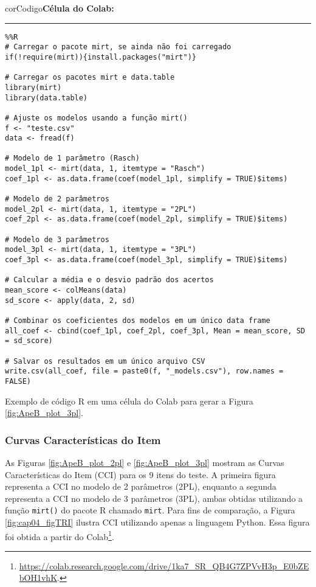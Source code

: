 \begin{listing}[!ht]
    \begin{myboxCode}{corCodigo}{\textbf{Célula do Colab: }}\vspace{3mm}
    \hrule
    \begin{verbatim}
%%R
# Carregar o pacote mirt, se ainda não foi carregado
if(!require(mirt)){install.packages("mirt")}

# Carregar os pacotes mirt e data.table
library(mirt)
library(data.table)

# Ajuste os modelos usando a função mirt()
f <- "teste.csv"
data <- fread(f)

# Modelo de 1 parâmetro (Rasch)
model_1pl <- mirt(data, 1, itemtype = "Rasch")
coef_1pl <- as.data.frame(coef(model_1pl, simplify = TRUE)$items)

# Modelo de 2 parâmetros
model_2pl <- mirt(data, 1, itemtype = "2PL")
coef_2pl <- as.data.frame(coef(model_2pl, simplify = TRUE)$items)

# Modelo de 3 parâmetros
model_3pl <- mirt(data, 1, itemtype = "3PL")
coef_3pl <- as.data.frame(coef(model_3pl, simplify = TRUE)$items)

# Calcular a média e o desvio padrão dos acertos
mean_score <- colMeans(data)
sd_score <- apply(data, 2, sd)

# Combinar os coeficientes dos modelos em um único data frame
all_coef <- cbind(coef_1pl, coef_2pl, coef_3pl, Mean = mean_score, SD = sd_score)

# Salvar os resultados em um único arquivo CSV
write.csv(all_coef, file = paste0(f, "_models.csv"), row.names = FALSE)
\end{verbatim}
\end{myboxCode}
\caption{Exemplo de código R em uma célula do Colab para gerar a Figura \ref{fig:ApeB_plot_3pl}.}
\label{lst:tri_estatisticas}
\end{listing}

\subsubsection{Curvas Características do Item}\label{sec:apeB_cci}

As Figuras \ref{fig:ApeB_plot_2pl} e \ref{fig:ApeB_plot_3pl} mostram as Curvas  Características do Item (CCI) para os 9 itens do teste. A primeira figura representa a CCI no modelo de 2 parâmetros (2PL), enquanto a segunda representa a CCI no modelo de 3 parâmetros (3PL), ambas obtidas utilizando a função \verb|mirt()| do pacote R chamado \verb|mirt|. Para fins de comparação, a Figura \ref{fig:cap04_figTRI} ilustra CCI utilizando apenas a linguagem Python. Essa figura foi obtida a partir do Colab\footnote{\url{https://colab.research.google.com/drive/1ka7_SR_QB4G7ZPVvH3p_E0bZEbOH1vhK}.}.

